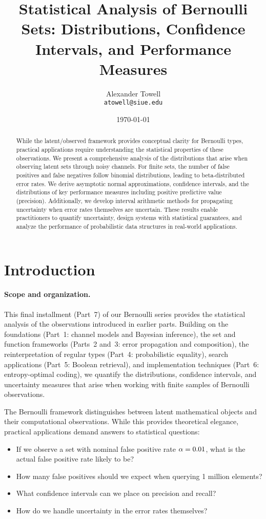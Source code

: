 \documentclass[11pt,final,hidelinks]{article}
\title{Statistical Analysis of Bernoulli Sets: Distributions, Confidence Intervals, and Performance Measures}
\author{
    Alexander Towell\\
    \texttt{atowell@siue.edu}
}
\date{\today}
\begin{document}
\maketitle
\NotationSection

\begin{abstract}
While the latent/observed framework provides conceptual clarity for Bernoulli types, practical applications require understanding the statistical properties of these observations. We present a comprehensive analysis of the distributions that arise when observing latent sets through noisy channels. For finite sets, the number of false positives and false negatives follow binomial distributions, leading to beta-distributed error rates. We derive asymptotic normal approximations, confidence intervals, and the distributions of key performance measures including positive predictive value (precision). Additionally, we develop interval arithmetic methods for propagating uncertainty when error rates themselves are uncertain. These results enable practitioners to quantify uncertainty, design systems with statistical guarantees, and analyze the performance of probabilistic data structures in real-world applications.
\end{abstract}

\section{Introduction}

\paragraph{Scope and organization.}  This final installment (Part~7) of our Bernoulli series provides the statistical analysis of the observations introduced in earlier parts.  Building on the foundations (Part~1: channel models and Bayesian inference), the set and function frameworks (Parts~2 and~3: error propagation and composition), the reinterpretation of regular types (Part~4: probabilistic equality), search applications (Part~5: Boolean retrieval), and implementation techniques (Part~6: entropy-optimal coding), we quantify the distributions, confidence intervals, and uncertainty measures that arise when working with finite samples of Bernoulli observations.

The Bernoulli framework distinguishes between latent mathematical objects and their computational observations. While this provides theoretical elegance, practical applications demand answers to statistical questions:
\begin{itemize}
    \item If we observe a set with nominal false positive rate $\alpha = 0.01$, what is the actual false positive rate likely to be?
    \item How many false positives should we expect when querying 1 million elements?
    \item What confidence intervals can we place on precision and recall?
    \item How do we handle uncertainty in the error rates themselves?
\end{itemize}
\end{document}
